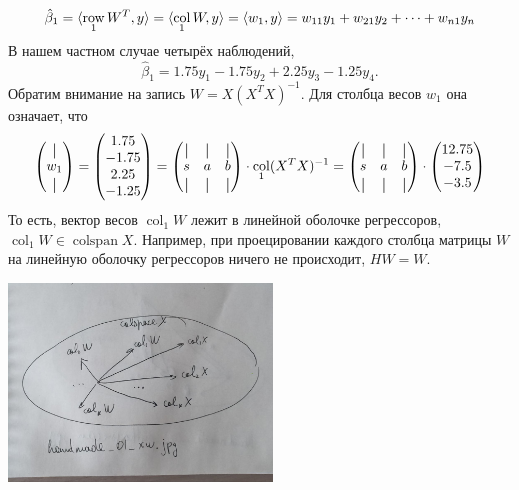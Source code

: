 \documentclass[12pt]{article}
\DeclareMathOperator{\col}{col}
\DeclareMathOperator{\colspan}{colspan}
\DeclareMathOperator{\row}{row}
\DeclarePairedDelimiter{\scalp}{\langle}{\rangle}
\newcommand*{\vertbar}{\rule[-1ex]{0.5pt}{2.5ex}}
\newcommand{\hb}{\hat{\beta}}
\begin{document}
\[
\hb_1 = \scalp{\row_1 W^T, y} = \scalp{\col_1 W, y} = \scalp{w_1, y}  = w_{11}y_1 + w_{21} y_2 + \dots + w_{n1} y_n 
\]
В нашем частном случае четырёх наблюдений,
\[
\hb_1 = 1.75 y_1 - 1.75 y_2 + 2.25y_3 - 1.25 y_4.
\]
Обратим внимание на запись $W = X(X^TX)^{-1}$.
Для столбца весов $w_1$ она означает, что
\[
\begin{pmatrix}
    \vertbar \\
    w_1 \\
    \vertbar
\end{pmatrix} =
\begin{pmatrix}
    1.75 \\
    -1.75 \\
    2.25 \\
    -1.25
\end{pmatrix} =
\begin{pmatrix}
    \vertbar & \vertbar & \vertbar \\
    s & a & b \\
    \vertbar & \vertbar & \vertbar \\    
\end{pmatrix} \cdot \col_1 (X^TX)^{-1} = 
\begin{pmatrix}
    \vertbar & \vertbar & \vertbar \\
    s & a & b \\
    \vertbar & \vertbar & \vertbar \\    
\end{pmatrix} \cdot \begin{pmatrix}
    12.75 \\
    -7.5 \\
    -3.5 \\
\end{pmatrix}
\]
То есть, вектор весов $\col_1 W$ лежит в линейной оболочке регрессоров, $\col_1 W \in  \colspan X$.
Например, при проецировании каждого столбца матрицы $W$ на линейную оболочку регрессоров ничего не происходит, $HW = W$.

\begin{minipage}{\textwidth}
\includegraphics[width=7cm]{handmade/handmade_01_xw.jpg}
\end{minipage}
\end{document}
